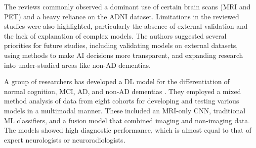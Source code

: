The reviews commonly observed a dominant use of certain brain scans (MRI and PET) and a heavy reliance on the ADNI dataset. Limitations in the reviewed studies were also highlighted, particularly the absence of external validation and the lack of explanation of complex models. The authors suggested several priorities for future studies, including validating models on external datasets, using methods to make AI decisions more transparent, and expanding research into under-studied areas like non-AD dementias.

A group of researchers has developed a DL model for the differentiation of normal cognition, MCI, AD, and non-AD dementias \cite{Qiu2022Multimodal}. They employed a mixed method analysis of data from eight cohorts for developing and testing various models in a multimodal manner. These included an MRI-only CNN, traditional ML classifiers, and a fusion model that combined imaging and non-imaging data. The models showed high diagnostic performance, which is almost equal to that of expert neurologists or neuroradiologists. 

